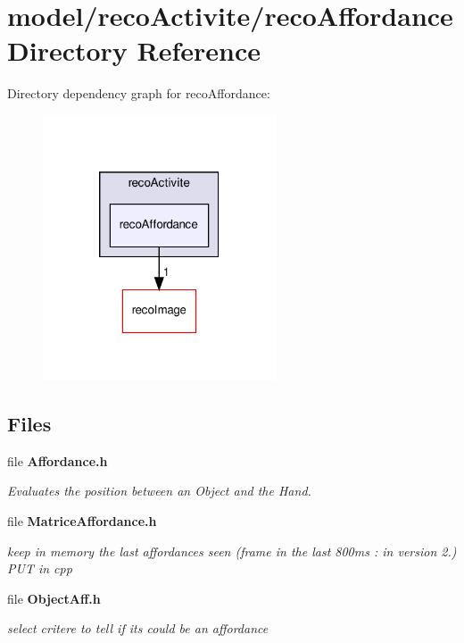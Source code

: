 \section{model/reco\+Activite/reco\+Affordance Directory Reference}
\label{dir_da6a2f17ea3fc470b7105bb51ec105b1}
Directory dependency graph for reco\+Affordance\+:
\nopagebreak
\begin{figure}[H]
\begin{center}
\leavevmode
\includegraphics[width=196pt]{dir_da6a2f17ea3fc470b7105bb51ec105b1_dep}
\end{center}
\end{figure}
\subsection*{Files}
\begin{DoxyCompactItemize}
\item 
file \textbf{ Affordance.\+h}
\begin{DoxyCompactList}\small\item\em Evaluates the position between an Object and the Hand. \end{DoxyCompactList}\item 
file \textbf{ Matrice\+Affordance.\+h}
\begin{DoxyCompactList}\small\item\em keep in memory the last affordances seen (frame in the last 800ms \+: in version 2.) P\+UT in cpp \end{DoxyCompactList}\item 
file \textbf{ Object\+Aff.\+h}
\begin{DoxyCompactList}\small\item\em select critere to tell if it\textquotesingle{}s could be an affordance \end{DoxyCompactList}\end{DoxyCompactItemize}
